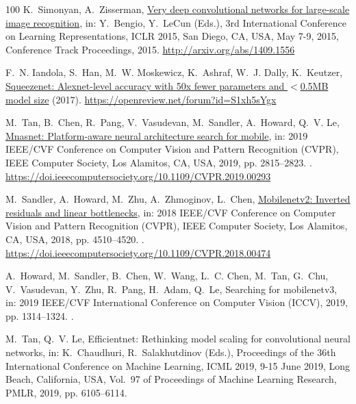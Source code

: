 \documentclass[final,3p,times,twocolumn]{elsarticle}
\begin{document}
\begin{thebibliography}{100}
K.~Simonyan, A.~Zisserman, \href{http://arxiv.org/abs/1409.1556}{Very deep
  convolutional networks for large-scale image recognition}, in: Y.~Bengio,
  Y.~LeCun (Eds.), 3rd International Conference on Learning Representations,
  {ICLR} 2015, San Diego, CA, USA, May 7-9, 2015, Conference Track Proceedings,
  2015.
\newline\urlprefix\url{http://arxiv.org/abs/1409.1556}

F.~N. Iandola, S.~Han, M.~W. Moskewicz, K.~Ashraf, W.~J. Dally, K.~Keutzer,
  \href{https://openreview.net/forum?id=S1xh5sYgx}{Squeezenet: Alexnet-level
  accuracy with 50x fewer parameters and \ensuremath{<}0.5{MB} model size}
  (2017).
\newline\urlprefix\url{https://openreview.net/forum?id=S1xh5sYgx}

M.~Tan, B.~Chen, R.~Pang, V.~Vasudevan, M.~Sandler, A.~Howard, Q.~V. Le,
  \href{https://doi.ieeecomputersociety.org/10.1109/CVPR.2019.00293}{Mnasnet:
  Platform-aware neural architecture search for mobile}, in: 2019 IEEE/CVF
  Conference on Computer Vision and Pattern Recognition (CVPR), IEEE Computer
  Society, Los Alamitos, CA, USA, 2019, pp. 2815--2823.
\newblock \href {https://doi.org/10.1109/CVPR.2019.00293}
  {}.
\newline\urlprefix\url{https://doi.ieeecomputersociety.org/10.1109/CVPR.2019.00293}

M.~Sandler, A.~Howard, M.~Zhu, A.~Zhmoginov, L.~Chen,
  \href{https://doi.ieeecomputersociety.org/10.1109/CVPR.2018.00474}{Mobilenetv2:
  Inverted residuals and linear bottlenecks}, in: 2018 IEEE/CVF Conference on
  Computer Vision and Pattern Recognition (CVPR), IEEE Computer Society, Los
  Alamitos, CA, USA, 2018, pp. 4510--4520.
\newblock \href {https://doi.org/10.1109/CVPR.2018.00474}
  {}.
\newline\urlprefix\url{https://doi.ieeecomputersociety.org/10.1109/CVPR.2018.00474}

A.~Howard, M.~Sandler, B.~Chen, W.~Wang, L.~C. Chen, M.~Tan, G.~Chu,
  V.~Vasudevan, Y.~Zhu, R.~Pang, H.~Adam, Q.~Le, Searching for mobilenetv3, in:
  2019 IEEE/CVF International Conference on Computer Vision (ICCV), 2019, pp.
  1314--1324.
\newblock \href {https://doi.org/10.1109/ICCV.2019.00140}
  {}.

M.~Tan, Q.~V. Le, Efficientnet: Rethinking model scaling for convolutional
  neural networks, in: K.~Chaudhuri, R.~Salakhutdinov (Eds.), Proceedings of
  the 36th International Conference on Machine Learning, {ICML} 2019, 9-15 June
  2019, Long Beach, California, {USA}, Vol.~97 of Proceedings of Machine
  Learning Research, {PMLR}, 2019, pp. 6105--6114.


\end{thebibliography}
\end{document}
